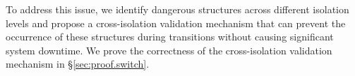 To address this issue, we identify dangerous structures across different isolation levels and propose a cross-isolation validation mechanism that can prevent the occurrence of these structures during transitions without causing significant system downtime.
We prove the correctness of the cross-isolation validation mechanism in \S\ref{sec:proof.switch}. 


